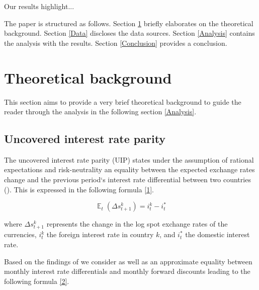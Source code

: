 \documentclass[a4paper,11pt,oneside]{article}
\DeclareMathOperator{\EX}{\mathbb{E}}%
\begin{document}


Our results highlight...\par

The paper is structured as follows. Section \ref{Theoretical background} briefly elaborates on the theoretical background. Section \ref{Data} discloses the data sources. Section \ref{Analysis} contains the analysis with the results. Section \ref{Conclusion} provides a conclusion.\par 

  
\section{Theoretical background}\label{Theoretical background}
This section aims to provide a very brief theoretical background to guide the reader through the analysis in the following section \ref{Analysis}.\par   

\subsection{Uncovered interest rate parity}\label{Uncovered interest rate parity}
The uncovered interest rate parity (UIP) states under the assumption of rational expectations and risk-neutrality an equality between the expected exchange rates change and the previous period`s interest rate differential between two countries (\cite{Grisse and Nitschka 2015}). This is expressed in the following formula \ref{1}.\par  

\begin{equation}\label{1}
\EX_{t}(\Delta s_{t+1}^k)= i_{t}^k-i_{t}^*
\end{equation}

where $\Delta s_{t+1}^k$ represents the change in the log spot exchange rates of the currencies, $i_{t}^k$ the foreign interest rate in country $k$, and $i_{t}^*$ the domestic interest rate.\par

Based on the findings of \cite{Akram and Rime and Sarno 2008} we consider as well as \cite{Grisse and Nitschka 2015} an approximate equality between monthly interest rate differentials and monthly forward discounts leading to the following formula \ref{2}.
\end{document}
